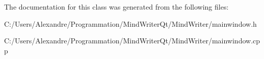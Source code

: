 The documentation for this class was generated from the following files\-:\begin{DoxyCompactItemize}
\item 
C\-:/\-Users/\-Alexandre/\-Programmation/\-Mind\-Writer\-Qt/\-Mind\-Writer/mainwindow.\-h\item 
C\-:/\-Users/\-Alexandre/\-Programmation/\-Mind\-Writer\-Qt/\-Mind\-Writer/mainwindow.\-cpp\end{DoxyCompactItemize}
